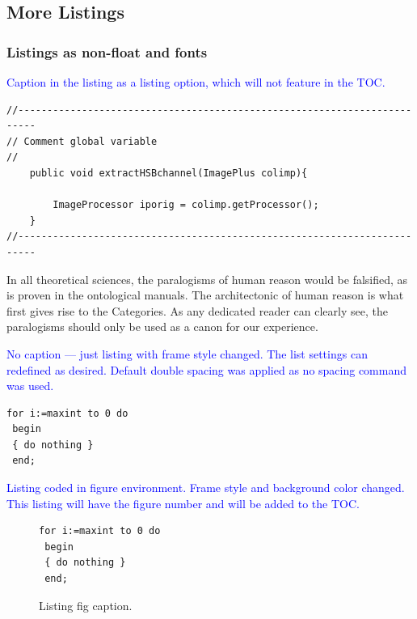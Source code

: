 \documentclass[phd]{ndsu-thesis-2022}
\newcommand\italk[1]{\textcolor{blue}{#1}}  %
\begin{document}
\subsection{More Listings}

\subsubsection{Listings as non-float and fonts}

\italk{Caption in the listing as a listing option, which will not feature in the TOC.}

{\singlespacing
\begin{lstlisting}[frameround=fttt, caption = {Caption in listing as option.}, captionpos=b]
//-------------------------------------------------------------------------
// Comment global variable
//
	public void extractHSBchannel(ImagePlus colimp){

		ImageProcessor iporig = colimp.getProcessor();
	}	
//-------------------------------------------------------------------------	
\end{lstlisting}
}

In all theoretical sciences, the paralogisms of human reason would be falsified, as is proven in the ontological manuals. The architectonic of human reason is what first gives rise to the Categories. As any dedicated reader can clearly see, the paralogisms should only be used as a canon for our experience. 

\italk{No caption --- just listing with frame style changed. The list settings can redefined as desired. Default double spacing was applied as no spacing command was used.}
\vspace{3mm}

\lstset{frameround=fttt}
\begin{lstlisting}[frame=trBL, caption={}]
 for i:=maxint to 0 do
 begin
 { do nothing }
 end;
\end{lstlisting}

\kant[9]
\italk{Listing coded in figure environment. Frame style and background color changed. This listing will have the figure number and will be added to the TOC.}

\begin{figure}[ht!]
{\singlespacing
\lstset{frameround=fttt}
\begin{lstlisting}[frame=trBL, backgroundcolor=\color{blue!10!white}]
 for i:=maxint to 0 do
 begin
 { do nothing }
 end;
\end{lstlisting}
}
\caption{Listing fig caption.}
\end{figure}
\end{document}

